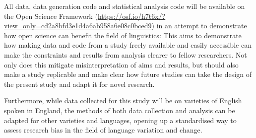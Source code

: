 \documentclass[12pt,a4paper]{article}
\begin{document}
All data, data generation code and statistical analysis code will be available on the Open Science Framework (\url{https://osf.io/h7t6x/?view_only=cd2a8bfd3e1d4a6ab958a6e08c0bced9}) in an attempt to demonstrate how open science can benefit the field of linguistics: This aims to demonstrate how making data and code from a study freely available and easily accessible can make the constraints and results from analysis clearer to fellow researchers. Not only does this mitigate misinterpretation of aims and results, but should also make a study replicable and make clear how future studies can take the design of the present study and adapt it for novel research.

Furthermore, while data collected for this study will be on varieties of English spoken in England, the methods of both data collection and analysis can be adapted for other varieties and languages, opening up a standardised way to assess research bias in the field of language variation and change.

\end{document}
